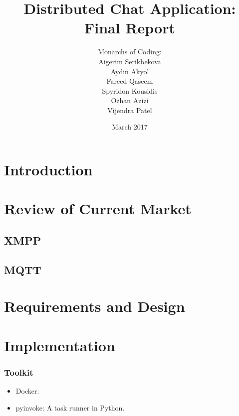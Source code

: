 \documentclass[11pt,a4paper]{report}
\begin{document}
\title{Distributed Chat Application: Final Report}
\author{Monarchs of Coding:\\
  Aigerim Serikbekova\\
  Aydin Akyol\\
  Fareed Qaseem\\
  Spyridon Kousidis\\
  Ozhan Azizi\\
  Vijendra Patel}
\date{March 2017}
\maketitle


\chapter{Introduction}

\chapter{Review of Current Market}


\section{XMPP}

\section{MQTT}

\chapter{Requirements and Design}


\chapter{Implementation}

\subsection{Toolkit}

\begin{itemize}
  \item Docker:
  \item pyinvoke: A task runner in Python.
\end{itemize}
\end{document}
